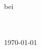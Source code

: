 

\begin{titlepage}


\begin{spacing}{1.5}
\vspace*{2cm}
\begin{center}
\vfill
\vfill
\vfill
\vfill
\LARGE
\textbf{\TitelMarkedup}
\vfill
\vfill
\vfill
\vfill
\Large
\textbf{\Name} \\
\vfill
\vfill
\vfill
\normalsize
\Betreff
\vfill
bei
\vfill
\Betreuer
\end{center}
\vfill
\vfill
\vfill
\vfill
\vfill
\vfill
\vfill
\vfill	
\Strasse \\
\PlzOrt \hfill \Semester\\ 
\href{mailto:\Email}{\Email} \hfill \today
\vspace*{1.5cm}
\end{spacing}
\end{titlepage}

\normalsize
